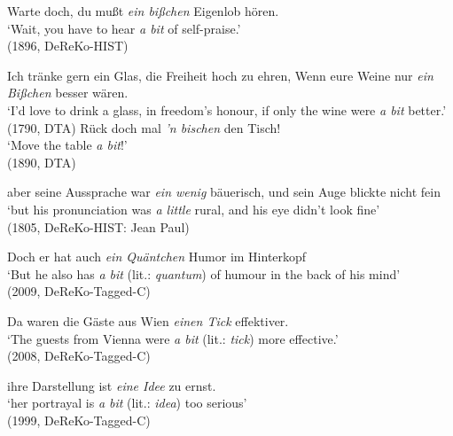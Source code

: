 \documentclass[output=paper]{langsci/langscibook}
\begin{document}
\begin{exe}
	\ex \label{ex:microcxn1}   
	\begin{xlist}
		\ex \label{ex:microcxn1a} Warte doch, du mußt \textit{ein bißchen} Eigenlob hören. \\
		`Wait, you have to hear \textit{a bit} of self-praise.' \\
		(1896, DeReKo-HIST) 
		
		\ex \label{ex:microcxn1b} 	Ich tränke gern ein Glas, die Freiheit hoch zu ehren, Wenn eure 	Weine nur \textit{ein Bißchen} besser wären. \\ 	
		`I’d love to drink a glass, in freedom’s honour, if only the wine 	were \textit{a bit} better.' \\ (1790, DTA)
		\ex \label{ex:microcxn1c} Rück doch mal \textit{'n bischen} den Tisch!  \\
	`Move the table \textit{a bit}!' \\ (1890, DTA)
		
		\end{xlist}

    \ex \label{ex:microcxn2}aber seine Aussprache war \textit{ein wenig} bäuerisch, und sein Auge 	blickte nicht fein \\
	`but his pronunciation was \textit{a little} rural, and his eye didn't look fine' \\ (1805, DeReKo-HIST: Jean Paul)

    \ex \label{ex:microcxn3} Doch er hat auch \textit{ein Quäntchen} Humor im Hinterkopf \\
	`But he also has \textit{a bit} (lit.: \textit{quantum}) of humour in the back of 	his mind' \\ (2009, DeReKo-Tagged-C) 

    \ex \label{ex:microcxn4} Da waren die Gäste aus Wien \textit{einen Tick} effektiver. \\
    `The guests from Vienna were \textit{a bit} (lit.: \textit{tick}) more effective.' \\ (2008, DeReKo-Tagged-C) 

    \ex \label{ex:microcxn5} ihre Darstellung ist \textit{eine Idee} zu ernst. \\
	`her portrayal is \textit{a bit} (lit.: \textit{idea}) too serious' \\ (1999, DeReKo-Tagged-C)
\end{exe}
\end{document}
